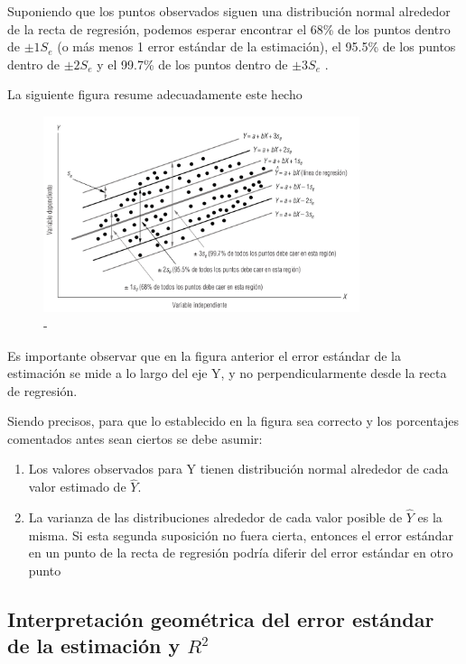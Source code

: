 \documentclass[
]{article}
\providecommand{\tightlist}{%
  \setlength{\itemsep}{0pt}\setlength{\parskip}{0pt}}
\begin{document}
Suponiendo que los puntos observados siguen una distribución normal
alrededor de la recta de regresión, podemos esperar encontrar el 68\% de
los puntos dentro de \(\pm 1 S_e\) (o más menos 1 error estándar de la
estimación), el 95.5\% de los puntos dentro de \(\pm 2 S_e\) y el 99.7\%
de los puntos dentro de \(\pm 3 S_e\) .

La siguiente figura resume adecuadamente este hecho

\begin{figure}
\centering
\includegraphics[width=3.64583in,height=\textheight]{error_regression_2.png}
\caption{-}
\end{figure}

Es importante observar que en la figura anterior el error estándar de la
estimación se mide a lo largo del eje Y, y no perpendicularmente desde
la recta de regresión.

Siendo precisos, para que lo establecido en la figura sea correcto y los
porcentajes comentados antes sean ciertos se debe asumir:

\begin{enumerate}
\def\labelenumi{\arabic{enumi}.}
\tightlist
\item
  Los valores observados para Y tienen distribución normal alrededor de
  cada valor estimado de \(\hat Y\).
\item
  La varianza de las distribuciones alrededor de cada valor posible de
  \(\hat Y\) es la misma. Si esta segunda suposición no fuera cierta,
  entonces el error estándar en un punto de la recta de regresión podría
  diferir del error estándar en otro punto
\end{enumerate}

\hypertarget{interpretaciuxf3n-geomuxe9trica-del-error-estuxe1ndar-de-la-estimaciuxf3n-y-r2}{%
\subsection{\texorpdfstring{Interpretación geométrica del error estándar
de la estimación y
\(R^2\)}{Interpretación geométrica del error estándar de la estimación y R\^{}2}}\label{interpretaciuxf3n-geomuxe9trica-del-error-estuxe1ndar-de-la-estimaciuxf3n-y-r2}}
\end{document}
